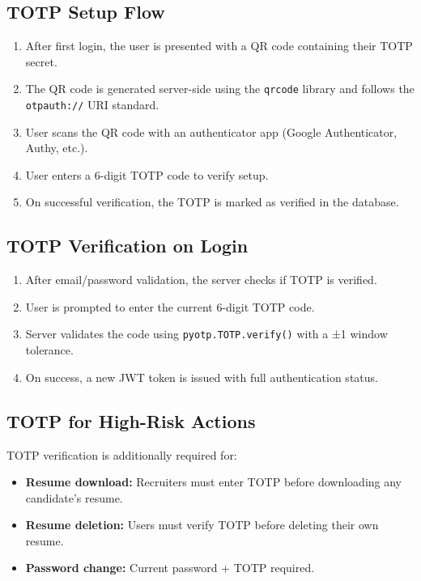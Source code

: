 \documentclass[12pt,a4paper]{article}
\begin{document}
\subsection{TOTP Setup Flow}
\begin{enumerate}
  \item After first login, the user is presented with a QR code containing their TOTP secret.
  \item The QR code is generated server-side using the \texttt{qrcode} library and follows the \texttt{otpauth://} URI standard.
  \item User scans the QR code with an authenticator app (Google Authenticator, Authy, etc.).
  \item User enters a 6-digit TOTP code to verify setup.
  \item On successful verification, the TOTP is marked as verified in the database.
\end{enumerate}

\subsection{TOTP Verification on Login}
\begin{enumerate}
  \item After email/password validation, the server checks if TOTP is verified.
  \item User is prompted to enter the current 6-digit TOTP code.
  \item Server validates the code using \texttt{pyotp.TOTP.verify()} with a ±1 window tolerance.
  \item On success, a new JWT token is issued with full authentication status.
\end{enumerate}

\subsection{TOTP for High-Risk Actions}
TOTP verification is additionally required for:
\begin{itemize}
  \item \textbf{Resume download:} Recruiters must enter TOTP before downloading any candidate's resume.
  \item \textbf{Resume deletion:} Users must verify TOTP before deleting their own resume.
  \item \textbf{Password change:} Current password + TOTP required.
\end{itemize}
\end{document}
